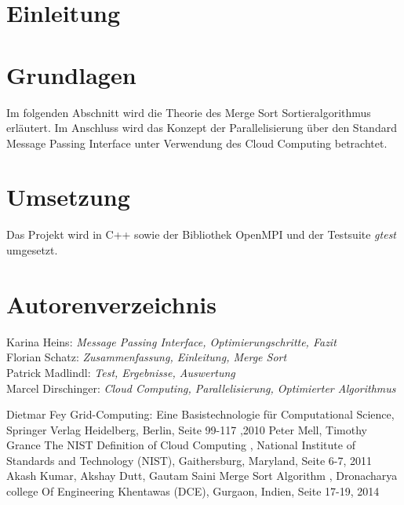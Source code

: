 \documentclass[conference]{IEEEtran}
\begin{document}
\section{Einleitung}

\section{Grundlagen}
Im folgenden Abschnitt wird die Theorie des Merge Sort Sortieralgorithmus erläutert. Im Anschluss wird das Konzept der Parallelisierung über den Standard Message Passing Interface unter Verwendung des Cloud Computing betrachtet.




\section{Umsetzung}
Das Projekt wird in C++ sowie der Bibliothek OpenMPI und der Testsuite \textit{gtest} umgesetzt.









\section*{Autorenverzeichnis}
\noindent 
Karina Heins: \textit{Message Passing Interface, Optimierungschritte, Fazit}\\
Florian Schatz: \textit{Zusammenfassung, Einleitung, Merge Sort}\\
Patrick Madlindl: \textit{Test, Ergebnisse, Auswertung}\\
Marcel Dirschinger: \textit{Cloud Computing, Parallelisierung, Optimierter Algorithmus}

\begin{thebibliography}{00}
 Dietmar Fey \glqq Grid-Computing: Eine Basistechnologie für Computational Science\grqq{}, Springer Verlag Heidelberg, Berlin, Seite 99-117 ,2010
 Peter Mell, Timothy Grance \glqq The NIST Definition of Cloud Computing \grqq{}, National Institute of Standards and Technology (NIST), Gaithersburg, Maryland, Seite 6-7, 2011
 Akash Kumar, Akshay Dutt, Gautam Saini \glqq Merge Sort Algorithm \grqq{}, Dronacharya college Of Engineering Khentawas (DCE),  Gurgaon, Indien, Seite 17-19, 2014

\end{thebibliography}
\end{document}
